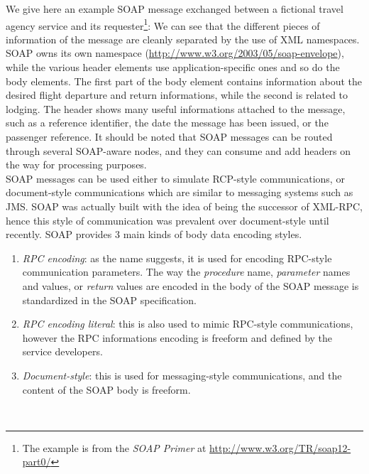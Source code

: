 We give here an example SOAP message exchanged between a fictional travel agency service and its requester\footnote{The example is from the \emph{SOAP Primer} at \url{http://www.w3.org/TR/soap12-part0/}}:
{\footnotesize }
We can see that the different pieces of information of the message are cleanly separated by the use of XML namespaces. SOAP owns its own namespace (\url{http://www.w3.org/2003/05/soap-envelope}), while the various header elements use application-specific ones and so do the body elements. The first part of the body element contains information about the desired flight departure and return informations, while the second is related to lodging. The header shows many useful informations attached to the message, such as a reference identifier, the date the message has been issued, or the passenger reference. It should be noted that SOAP messages can be routed through several SOAP-aware nodes, and they can consume and add headers on the way for processing purposes.\\

SOAP messages can be used either to simulate RCP-style communications, or document-style communications which are similar to messaging systems such as JMS. SOAP was actually built with the idea of being the successor of XML-RPC, hence this style of communication was prevalent over document-style until recently. SOAP provides 3 main kinds of body data encoding styles.
\begin{enumerate}

    \item \emph{RPC encoding}: as the name suggests, it is used for encoding RPC-style communication parameters. The way the \emph{procedure} name, \emph{parameter} names and values, or \emph{return} values are encoded in the body of the SOAP message is standardized in the SOAP specification.
    
    \item \emph{RPC encoding literal}: this is also used to mimic RPC-style communications, however the RPC informations encoding is freeform and defined by the service developers.
    
    \item \emph{Document-style}: this is used for messaging-style communications, and the content of the SOAP body is freeform.

\end{enumerate}\

